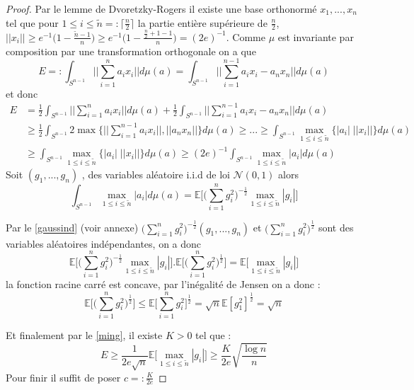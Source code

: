 \documentclass[12pt]{article}
\theoremstyle{definition}
\begin{document}
\begin{proof}
	Par le lemme de Dvoretzky-Rogers il existe une base orthonormé $x_1,...,x_n$ tel que pour $1\leq i \leq \tilde{n}=:\big\lceil\frac{n}{2}\big\rceil$ la partie entière supérieure de $\frac{n}{2}$, $||x_i||\geq e^{-1}\Big(1-\frac{\tilde{n} -1}{n}\Big)\geq e^{-1}\Big(1-\frac{\frac{n}{2}+1 -1}{n}\Big)= (2e)^{-1}$. Comme $\mu$ est invariante par composition par une transformation orthogonale on a que  
	\begin{equation*}
	E=:\int_{S^{n-1}} ||\sum_{i=1}^{n}a_ix_i||d\mu(a)= \int_{S^{n-1}} ||\sum_{i=1}^{n-1}a_ix_i-a_nx_n||d\mu(a)
	\end{equation*}
	et donc 
	\begin{align*}
	E&=\frac{1}{2}\int_{S^{n-1}} ||\sum_{i=1}^{n}a_ix_i||d\mu(a)+ \frac{1}{2}\int_{S^{n-1}} ||\sum_{i=1}^{n-1}a_ix_i-a_nx_n||d\mu(a)\\
	&\geq\frac{1}{2}\int_{S^{n-1}} 2\max\Big\{||\sum_{i=1}^{n-1}a_ix_i||,||a_nx_n||\Big\}d\mu(a)\geq ...\geq \int_{S^{n-1}} \max_{1\leq i \leq \tilde{n}}\Big\{|a_i|\;||x_i||\Big\}d\mu(a)\\
	&\geq \int_{S^{n-1}} \max_{1\leq i \leq \tilde{n}}\Big\{|a_i|\;||x_i||\Big\}d\mu(a) \geq (2e)^{-1}\int_{S^{n-1}} \max_{1\leq i \leq \tilde{n}}|a_i| d\mu(a)	
	\end{align*}
	Soit $(g_1,...,g_n)$ , des variables aléatoire i.i.d de loi $\mathcal{N}(0,1)$ alors 
	\begin{equation*}
	\int_{S^{n-1}} \max_{1\leq i \leq \tilde{n}}|a_i| d\mu(a) =\mathbb{E}\Big[\big(\sum_{i=1}^{n}g_i^2\big)^{-\frac{1}{2}} \max_{1\leq i \leq \tilde{n}}|g_i|\Big]
	\end{equation*}
	
	Par le \cref{gaussind} (voir annexe) $\big(\sum_{i=1}^{n}g_i^2\big)^{-\frac{1}{2}}(g_1,...,g_n)$ et $(\sum_{i=1}^{n}g_i^2\big)^{\frac{1}{2}}$ sont des variables aléatoires indépendantes, on a donc 
	\begin{equation*}
	\mathbb{E}\Big[\big(\sum_{i=1}^{n}g_i^2\big)^{-\frac{1}{2}} \max_{1\leq i \leq \tilde{n}}|g_i|\Big] . \mathbb{E}\Big[\big(\sum_{i=1}^{n}g_i^2\big)^{\frac{1}{2}}\Big] = \mathbb{E}\big[\max_{1\leq i \leq \tilde{n}}|g_i|\big]
	\end{equation*}
	la fonction racine carré est concave, par l'inégalité de Jensen on a donc :
	\begin{equation*}
	\mathbb{E}\big[\big(\sum_{i=1}^{n}g_i^2\big)^{\frac{1}{2}}\big]\leq \mathbb{E}\big[\sum_{i=1}^{n}g_i^2\big]^{\frac{1}{2}}= \sqrt{n} \mathbb{E}[g_1^2]^{\frac{1}{2}}=\sqrt{n} 
	\end{equation*}
	
	Et finalement par le \cref{ming}, il existe $K>0$ tel que :
	\begin{equation*}
	E\geq \frac{1}{2e\sqrt{n}} \mathbb{E}\big[\max_{1\leq i \leq \tilde{n}}|g_i|\big]\geq \frac{K}{2e}\sqrt{\frac{\log n}{n}}
	\end{equation*}
	Pour finir il suffit de poser $c=: \frac{K}{2e}$
\end{proof}
\end{document}
